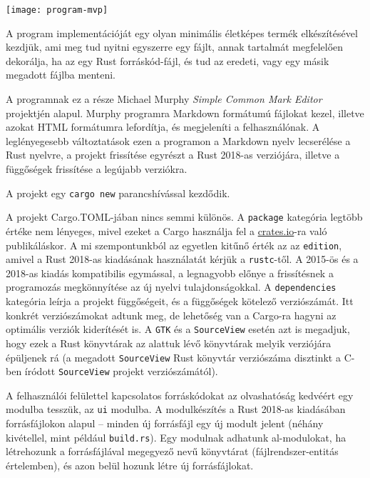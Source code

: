 
\graphicspath{{./kepek/}}


\texttt{[image: program-mvp]}

A program implementációját egy olyan minimális életképes termék elkészítésével kezdjük,
ami meg tud nyitni egyszerre egy fájlt, annak tartalmát megfelelően dekorálja,
ha az egy Rust forráskód-fájl, és tud az eredeti, vagy egy másik megadott fájlba menteni.

A programnak ez a része Michael Murphy \textit{Simple Common Mark Editor} projektjén alapul.\cite{gtk_tutorial}
Murphy programra Markdown formátumú fájlokat kezel, illetve azokat HTML formátumra lefordítja,
és megjeleníti a felhasználónak.
A leglényegesebb változtatások ezen a programon a Markdown nyelv lecserélése a Rust nyelvre,
a projekt frissítése egyrészt a Rust 2018-as verziójára, illetve a függőségek frissítése a legújabb verziókra.

A projekt egy \texttt{cargo new} parancshívással kezdődik.




A projekt Cargo.TOML-jában nincs semmi különös.
A \texttt{package} kategória legtöbb értéke nem lényeges, mivel ezeket a Cargo használja fel
a \url{crates.io}-ra való publikáláskor.
A mi szempontunkból az egyetlen kitűnő érték az az \texttt{edition}, amivel a Rust 2018-as
kiadásának használatát kérjük a \texttt{rustc}-től.
A 2015-ös és a 2018-as kiadás kompatibilis egymással,\cite{rust:editions}
a legnagyobb előnye a frissítésnek a programozás megkönnyítése az új nyelvi tulajdonságokkal.
A \texttt{dependencies} kategória leírja a projekt függőségeit, és a függőségek kötelező verziószámát.
Itt konkrét verziószámokat adtunk meg, de lehetőség van a Cargo-ra hagyni az optimális verziók kiderítését is.
A \texttt{GTK} és a \texttt{SourceView} esetén azt is megadjuk, 
hogy ezek a Rust könyvtárak az alattuk lévő könyvtárak melyik verziójára épüljenek rá
(a megadott \texttt{SourceView} Rust könyvtár verziószáma disztinkt a C-ben íródott \texttt{SourceView}
projekt verziószámától).


A felhasználói felülettel kapcsolatos forráskódokat az olvashatóság kedvéért egy modulba tesszük,
az \texttt{ui} modulba.
A modulkészítés a Rust 2018-as kiadásában forrásfájlokon alapul -- 
minden új forrásfájl egy új modult jelent (néhány kivétellel, mint például \texttt{build.rs}).
Egy modulnak adhatunk al-modulokat, ha létrehozunk a forrásfájlával megegyező nevű könyvtárat (fájlrendszer-entitás értelemben),
és azon belül hozunk létre új forrásfájlokat.

